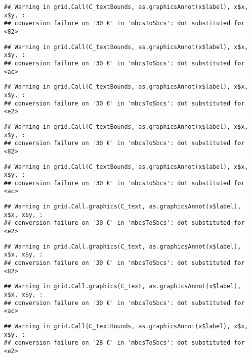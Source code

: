 \documentclass[
]{article}
\begin{document}
\begin{verbatim}
## Warning in grid.Call(C_textBounds, as.graphicsAnnot(x$label), x$x, x$y, :
## conversion failure on '30 €' in 'mbcsToSbcs': dot substituted for <82>
\end{verbatim}

\begin{verbatim}
## Warning in grid.Call(C_textBounds, as.graphicsAnnot(x$label), x$x, x$y, :
## conversion failure on '30 €' in 'mbcsToSbcs': dot substituted for <ac>
\end{verbatim}

\begin{verbatim}
## Warning in grid.Call(C_textBounds, as.graphicsAnnot(x$label), x$x, x$y, :
## conversion failure on '30 €' in 'mbcsToSbcs': dot substituted for <e2>
\end{verbatim}

\begin{verbatim}
## Warning in grid.Call(C_textBounds, as.graphicsAnnot(x$label), x$x, x$y, :
## conversion failure on '30 €' in 'mbcsToSbcs': dot substituted for <82>
\end{verbatim}

\begin{verbatim}
## Warning in grid.Call(C_textBounds, as.graphicsAnnot(x$label), x$x, x$y, :
## conversion failure on '30 €' in 'mbcsToSbcs': dot substituted for <ac>
\end{verbatim}

\begin{verbatim}
## Warning in grid.Call.graphics(C_text, as.graphicsAnnot(x$label), x$x, x$y, :
## conversion failure on '30 €' in 'mbcsToSbcs': dot substituted for <e2>
\end{verbatim}

\begin{verbatim}
## Warning in grid.Call.graphics(C_text, as.graphicsAnnot(x$label), x$x, x$y, :
## conversion failure on '30 €' in 'mbcsToSbcs': dot substituted for <82>
\end{verbatim}

\begin{verbatim}
## Warning in grid.Call.graphics(C_text, as.graphicsAnnot(x$label), x$x, x$y, :
## conversion failure on '30 €' in 'mbcsToSbcs': dot substituted for <ac>
\end{verbatim}

\begin{verbatim}
## Warning in grid.Call(C_textBounds, as.graphicsAnnot(x$label), x$x, x$y, :
## conversion failure on '28 €' in 'mbcsToSbcs': dot substituted for <e2>
\end{verbatim}
\end{document}
